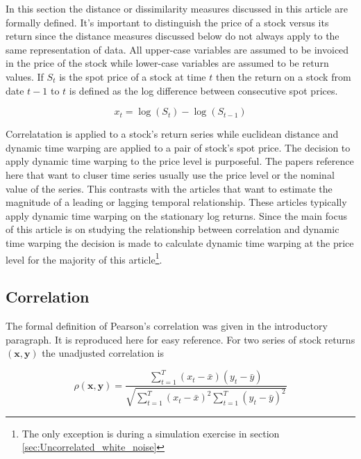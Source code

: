 \documentclass[12pt]{article}
\begin{document}
In this section the distance or dissimilarity measures discussed in this article are formally defined. It's important to distinguish the price of a stock versus its return since the distance measures discussed below do not always apply to the same representation of data. All upper-case variables are assumed to be invoiced in the price of the stock while lower-case variables are assumed to be return values. If $S_{t}$ is the spot price of a stock at time $t$ then the return on a stock from date $t-1$ to $t$ is defined as the log difference between consecutive spot prices.

\begin{equation} \label{eq:log_return_def}
    x_{t} = \log \left(S_{t}\right) - \log\left(S_{t-1}\right)
\end{equation}

 Correlatation is applied to a stock's return series while euclidean distance and dynamic time warping are applied to a pair of stock's spot price. The decision to apply dynamic time warping to the price level is purposeful. The papers reference here that want to cluser time series usually use the price level or the nominal value of the series. This contrasts with the articles that want to estimate the magnitude of a leading or lagging temporal relationship. These articles typically apply dynamic time warping on the stationary log returns. Since the main focus of this article is on studying the relationship between correlation and dynamic time warping the decision is made to calculate dynamic time warping at the price level for the majority of this article\footnote{The only exception is during a simulation exercise in section \ref{sec:Uncorrelated_white_noise}}.

\subsection{Correlation}

The formal definition of Pearson's correlation was given in the introductory paragraph. It is reproduced here for easy reference. For two series of stock returns $(\boldsymbol{x}, \boldsymbol{y})$ the unadjusted correlation is

\begin{equation} \label{eq:pearsons_rho}
\rho(\boldsymbol{x}, \boldsymbol{y}) = \frac{ \sum_{t=1}^{T} (x_{t} - \bar{x}) (y_{t} - \bar{y})}{ \sqrt{\sum_{t=1}^{T} (x_{t} - \bar{x})^{2} \sum_{t=1}^{T} (y_{t} - \bar{y})^{2}}}
\end{equation}
\end{document}
